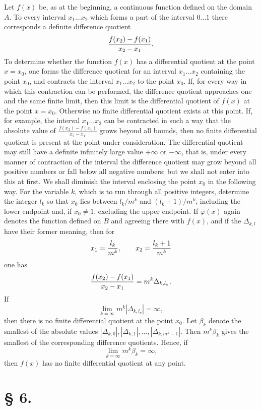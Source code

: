 Let $f(x)$ be, as at the beginning, a continuous function defined on the domain $A$. To every interval $x_1\ldots x_2$ which forms a part of the interval $0\ldots1$ there corresponds a definite difference quotient
\[
 {f(x_2)-f(x_1)\over x_2-x_1}.
\]
To determine whether the function $f(x)$ has a differential quotient at the point $x=x_0$, one forms the difference quotient for an interval $x_1\ldots x_2$ containing the point $x_0$, and contracts the interval $x_1\ldots x_2$ to the point $x_0$. If, for every way in which this contraction can be performed, the difference quotient approaches one and the same finite limit, then this limit is the differential quotient of $f(x)$ at the point $x=x_0$. Otherwise no finite differential quotient exists at this point. If, for example, the interval $x_1\ldots x_2$ can be contracted in such a way that the absolute value of $\frac{f(x_2)-f(x_1)}{x_2-x_1}$ grows beyond all bounds, then no finite differential quotient is present at the point under consideration. The differential quotient may still have a definite infinitely large value $+\infty$ or $-\infty$, that is, under every manner of contraction of the interval the difference quotient may grow beyond all positive numbers or fall below all negative numbers; but we shall not enter into this at first. We shall diminish the interval enclosing the point $x_0$ in the following way. For the variable $k$, which is to run through all positive integers, determine the integer $l_k$ so that $x_0$ lies between $l_k/m^k$ and $(l_k+1)/m^k$, including the lower endpoint and, if $x_0\ne1$, excluding the upper endpoint. If $\varphi(x)$ again denotes the function defined on $B$ and agreeing there with $f(x)$, and if the $\Delta_{k,l}$ have their former meaning, then for
\[
 x_1={l_k\over m^k},\qquad x_2={l_k+1\over m^k}
\]
one has
\[
 {f(x_2)-f(x_1)\over x_2-x_1}=m^k\Delta_{k,l_k}.
\]
If
\[
 \lim_{k=\infty}m^k|\Delta_{k,l_k}|=\infty,
\]
then there is no finite differential quotient at the point $x_0$. Let $\beta_k$ denote the smallest of the absolute values $|\Delta_{k,0}|,|\Delta_{k,1}|,\ldots,|\Delta_{k,m^k-1}|$. Then $m^k\beta_k$ gives the smallest of the corresponding difference quotients. Hence, if
\[
 \lim_{k=\infty}m^k\beta_k=\infty,
\]
then $f(x)$ has no finite differential quotient at any point.

\section*{§ 6.}

